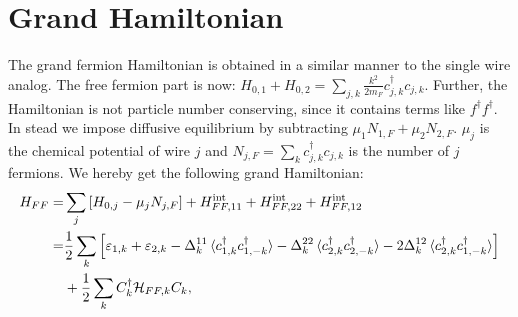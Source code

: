 \section{Grand Hamiltonian}
\label{sec.2wiresgrandHFF}
The grand fermion Hamiltonian is obtained in a similar manner to the single wire analog. The free fermion part is now: $H_{0,1}+H_{0,2} = \sum_{j,k}\frac{k^2}{2m_F}c^\dagger_{j,k}c_{j,k}$. Further, the Hamiltonian is not particle number conserving, since it contains terms like $f^\dagger f^\dagger$. In stead we impose diffusive equilibrium by subtracting $\mu_1N_{1,F}+\mu_2N_{2,F}$. $\mu_j$ is the chemical potential of wire $j$ and $N_{j,F} = \sum_k c^\dagger_{j,k}c_{j,k}$ is the number of $j$ fermions. We hereby get the following grand Hamiltonian:
\begin{align}
H_{FF} = &\sum_j \left[H_{0,j} - \mu_j N_{j,F}\right] + H^\text{int}_{FF,11} + H^\text{int}_{FF,22} + H^\text{int}_{FF,12} \nonumber \\
       = &\frac{1}{2}\sum_k\left[\varepsilon_{1,k} + \varepsilon_{2,k} - \Delta^{11}_k\braket{c^\dagger_{1,k}c^\dagger_{1,-k}} - \Delta^{22}_k\braket{c^\dagger_{2,k}c^\dagger_{2,-k}} - 2\Delta^{12}_k\braket{c^\dagger_{2,k}c^\dagger_{1,-k}} \right] \nonumber \\
       & + \frac{1}{2}\sum_k C^\dagger_k \mathcal{H}_{FF,k}C_k,
\end{align}

